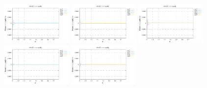 \noindent
\includegraphics[width=3.5cm]{python_codes/fieldstone_152/RESULTS/exp1/d_t_64_m2}
\includegraphics[width=3.5cm]{python_codes/fieldstone_152/RESULTS/exp1/d_t_64_m3}
\includegraphics[width=3.5cm]{python_codes/fieldstone_152/RESULTS/exp1/d_t_64_m4}
\includegraphics[width=3.5cm]{python_codes/fieldstone_152/RESULTS/exp1/d_t_64_m5}
\includegraphics[width=3.5cm]{python_codes/fieldstone_152/RESULTS/exp1/d_t_64_m6}

